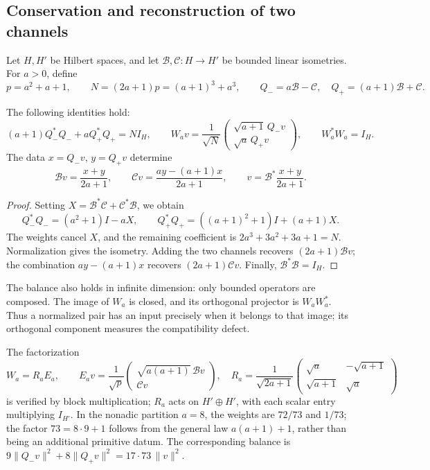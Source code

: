 \subsection{Conservation and reconstruction of two channels}
\label{subsec:acoplamiento-bilateral}

Let \(H,H'\) be Hilbert spaces, and let
\(\mathcal B,\mathcal C:H\to H'\) be bounded linear isometries.
For \(a>0\), define
\[
 p=a^2+a+1,\qquad N=(2a+1)p=(a+1)^3+a^3,\qquad
 Q_-=a\mathcal B-\mathcal C,\quad Q_+=(a+1)\mathcal B+\mathcal C.
\]

\begin{theorem}
\label{thm:acoplamiento-balance}
The following identities hold:
\[
 (a+1)Q_-^*Q_-+aQ_+^*Q_+=NI_H,\qquad
 W_av=\frac1{\sqrt N}
 \begin{pmatrix}\sqrt{a+1}\,Q_-v\\\sqrt a\,Q_+v\end{pmatrix},
 \qquad W_a^*W_a=I_H.
\]
The data \(x=Q_-v\), \(y=Q_+v\) determine
\[
 \mathcal Bv=\frac{x+y}{2a+1},\qquad
 \mathcal Cv=\frac{ay-(a+1)x}{2a+1},\qquad
 v=\mathcal B^*\frac{x+y}{2a+1}.
\]
\end{theorem}
\begin{proof}
Setting \(X=\mathcal B^*\mathcal C+\mathcal C^*\mathcal B\), we obtain
\[
 Q_-^*Q_-=(a^2+1)I-aX,\qquad
 Q_+^*Q_+=((a+1)^2+1)I+(a+1)X.
\]
The weights cancel \(X\), and the remaining coefficient is
\(2a^3+3a^2+3a+1=N\). Normalization gives the isometry.
Adding the two channels recovers \((2a+1)\mathcal Bv\);
the combination \(ay-(a+1)x\) recovers \((2a+1)\mathcal Cv\).
Finally, \(\mathcal B^*\mathcal B=I_H\).
\end{proof}

The balance also holds in infinite dimension: only bounded operators
are composed. The image of \(W_a\) is closed, and its orthogonal
projector is \(W_aW_a^*\). Thus a normalized pair has an
input precisely when it belongs to that image; its orthogonal
component measures the compatibility defect.

The factorization
\[
 W_a=R_aE_a,\qquad
 E_av=\frac1{\sqrt p}
 \begin{pmatrix}\sqrt{a(a+1)}\,\mathcal Bv\\\mathcal Cv\end{pmatrix},
 \quad
 R_a=\frac1{\sqrt{2a+1}}
 \begin{pmatrix}\sqrt a&-\sqrt{a+1}\\
 \sqrt{a+1}&\sqrt a\end{pmatrix}
\]
is verified by block multiplication; \(R_a\) acts on
\(H'\oplus H'\), with each scalar entry multiplying \(I_{H'}\).
In the nonadic partition
\(a=8\), the weights are \(72/73\) and \(1/73\); the factor
\(73=8\cdot9+1\) follows from the general law
\(a(a+1)+1\), rather than being an additional primitive datum. The corresponding balance is
\(9\|Q_-v\|^2+8\|Q_+v\|^2=17\cdot73\,\|v\|^2\).


